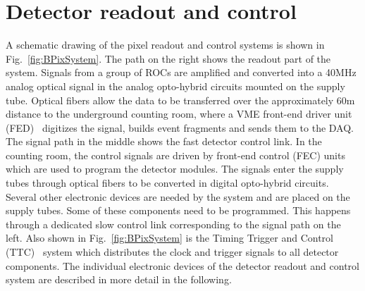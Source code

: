 
\section{Detector readout and control}\label{sec:BPix_DAQ}

A schematic drawing of the pixel readout and control systems is shown in Fig.~\ref{fig:BPixSystem}.
The path on the right shows the readout part of the system.
Signals from a group of ROCs are amplified and converted into a 40\unit{MHz} analog optical signal in the analog opto-hybrid circuits mounted on the supply tube.
Optical fibers allow the data to be transferred over the approximately 60\unit{m} distance to the underground counting room, where a VME front-end driver unit (FED)~\cite{Pernicka:1091743} digitizes the signal, builds event fragments and sends them to the DAQ.
The signal path in the middle shows the fast detector control link.
In the counting room, the control signals are driven by front-end control (FEC) units~\cite{Gill:921198} which are used to program the detector modules.
The signals enter the supply tubes through optical fibers to be converted in digital opto-hybrid circuits.
Several other electronic devices are needed by the system and are placed on the supply tubes.
Some of these components need to be programmed. This happens through a dedicated slow control link corresponding to the signal path on the left.
Also shown in Fig.~\ref{fig:BPixSystem} is the Timing Trigger and Control (TTC)~\cite{Taylor:592719} system which distributes the clock and trigger signals to all detector components.
The individual electronic devices of the detector readout and control system are described in more detail in the following.


